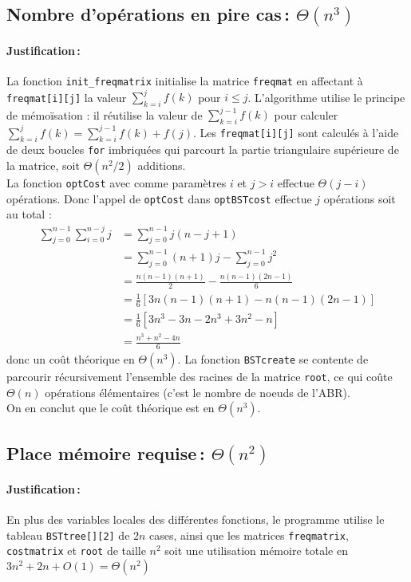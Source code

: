 \documentclass[a4paper,10pt,french]{article}
\def\saut#1{\vspace{#1\baselineskip}}
\newcommand{\dsp}{\displaystyle}
\begin{document}
\subsection{Nombre  d'opérations en pire cas\,: $\Theta(n^3)$}
\paragraph{Justification\,: }
La fonction \texttt{init\_freqmatrix} initialise la matrice \texttt{freqmat} en affectant à \texttt{freqmat[i][j]} la valeur $\dsp\sum_{k=i}^j f(k)$ pour $i\leq j$.
L'algorithme utilise le principe de mémoïsation : il réutilise la valeur de $\dsp\sum_{k=i}^{j-1}f(k)$ pour calculer $\dsp\sum_{k=i}^jf(k)=\sum_{k=i}^{j-1}f(k)+f(j)$.
Les \texttt{freqmat[i][j]} sont calculés à l'aide de deux boucles \texttt{for} imbriquées qui parcourt la partie triangulaire supérieure de la matrice, soit $\Theta(n^2/2)$ additions.
\saut{1}\\
La fonction \texttt{optCost} avec comme paramètres $i$ et $j>i$ effectue $\Theta(j-i)$ opérations. Donc l'appel de \texttt{optCost} dans \texttt{optBSTcost} effectue $j$ opérations soit au total :
\begin{align*}
    \sum_{j=0}^{n-1}\sum_{i=0}^{n-j}j&=\sum_{j=0}^{n-1}j(n-j+1) \\
    &=\sum_{j=0}^{n-1}(n+1)j-\sum_{j=0}^{n-1}j^2 \\
    &=\frac{n(n-1)(n+1)}{2}-\frac{n(n-1)(2n-1)}{6} \\
    &=\frac{1}{6}\left[3n(n-1)(n+1)-n(n-1)(2n-1)\right] \\
    &=\frac{1}{6}\left[3n^3-3n-2n^3+3n^2-n\right] \\
    &=\frac{n^3+n^2-4n}{6}
\end{align*}
donc un coût théorique en $\Theta(n^3)$.
La fonction \texttt{BSTcreate} se contente de parcourir récursivement l'ensemble des racines de la matrice \texttt{root}, ce qui coûte $\Theta(n)$ opérations élémentaires (c'est le nombre de noeuds de l'ABR).
\saut{1}\\
On en conclut que le coût théorique est en $\Theta(n^3)$.

\subsection{Place mémoire requise\,: $\Theta(n^2)$}
\paragraph{Justification\,: }
En plus des variables locales des différentes fonctions, le programme utilise le tableau \texttt{BSTtree[][2]} de $2n$ cases, ainsi que les matrices \texttt{freqmatrix}, \texttt{costmatrix} et \texttt{root} de taille $n^2$ soit une utilisation mémoire totale en $3n^2+2n+O(1)=\Theta(n^2)$
\end{document}
